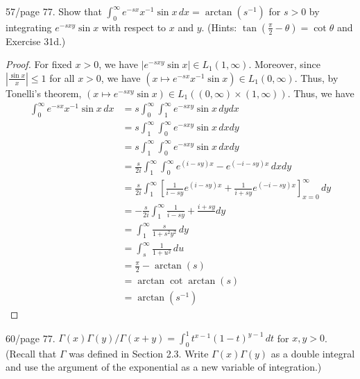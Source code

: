 \documentclass{article}
\begin{document}
 57/page 77. Show that $\int_0^\infty e^{-sx}x^{-1} \sin x \, dx = \arctan(s^{-1})$ for $s > 0$ by integrating $e^{-sxy}\sin x$ with respect to $x$ and $y$.  (Hints: $\tan(\frac \pi 2 - \theta) = \cot \theta$ and Exercise 31d.) %
\begin{proof}
For fixed $x > 0$, we have $\left| e^{-sxy} \sin x \right| \in L_1(1, \infty)$. Moreover, since $\left| \frac {\sin x} x \right| \le 1$ for all $x > 0$, we have $(x \mapsto e^{-sx} x^{-1} \sin x) \in L_1(0,\infty)$. Thus, by Tonelli's theorem, $(x \mapsto e^{-sxy} \sin x) \in L_1((0,\infty) \times (1, \infty))$. Thus, we have
\begin{align*}
\int_0^\infty  e^{-sx} x^{-1} \sin x \, dx & =  s \int_0^\infty \int_1^\infty e^{-sxy} \sin x \, dy dx 
\\ & =  s \int_1^\infty \int_0^\infty e^{-sxy} \sin x \, dx dy
\\ & =  s \int_1^\infty \int_0^\infty e^{-sxy} \sin x \, dx dy
\\ & =  \frac s {2i} \int_1^\infty \int_0^\infty e^{(i-sy)x} - e^{(-i-sy)x} \, dx dy
\\ & =  \frac s {2i} \int_1^\infty \left[\frac 1 {i - sy} e^{(i-sy)x} + \frac 1 {i + sy} e^{(-i-sy)x} \right]_{x = 0}^\infty \,  dy
\\ & =  - \frac s {2i} \int_1^\infty \frac 1 {i - sy} + \frac {i + sy}  \,  dy
\\ & =   \int_1^\infty \frac s {1 + s^2y^2}  \,  dy
\\ & =   \int_{s}^\infty \frac 1 {1 + u^2}  \,  du
\\ & = \frac \pi 2 - \arctan(s) 
\\ & = \arctan \cot \arctan(s) 
\\ & = \arctan (s^{-1}) 
\end{align*}
\end{proof}

 60/page 77. $\Gamma(x) \Gamma(y)/ \Gamma(x + y) = \int_0^1 t^{x-1}(1-t)^{y-1} \, dt$ for $x,y > 0$. (Recall that $\Gamma$ was defined in Section 2.3. Write $\Gamma(x) \Gamma(y)$ as a double integral and use the argument of the exponential as a new variable of integration.)
\end{document}
